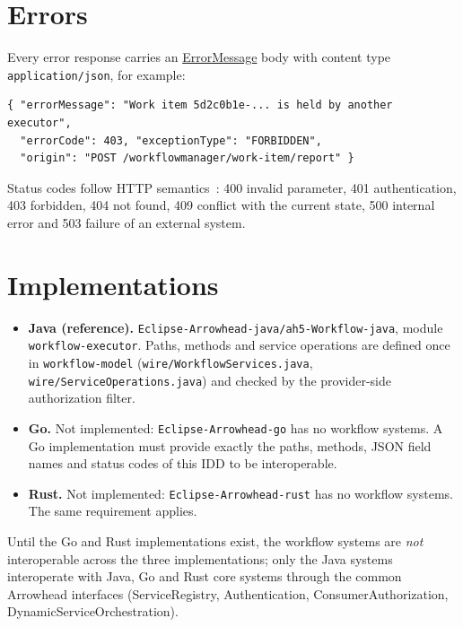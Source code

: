 \documentclass[a4paper]{arrowhead}
\newcommand{\mref}[1]{{\textcolor{ArrowheadPurple}{\hyperref[sec:model:#1]{#1}}}}
\begin{document}
\section{Errors}
\label{sec:errors}
Every error response carries an \mref{ErrorMessage} body with content type \texttt{application/\allowbreak{}json}, for example:
\begin{lstlisting}
{ "errorMessage": "Work item 5d2c0b1e-... is held by another executor",
  "errorCode": 403, "exceptionType": "FORBIDDEN",
  "origin": "POST /workflowmanager/work-item/report" }
\end{lstlisting}
Status codes follow HTTP semantics~\cite{rfc9110}: 400 invalid parameter, 401 authentication, 403 forbidden, 404 not
found, 409 conflict with the current state, 500 internal error and 503 failure of an external system.


\section{Implementations}
\label{sec:implementations}
\begin{itemize}
\item \textbf{Java (reference).} \texttt{Eclipse-\allowbreak{}Arrowhead-\allowbreak{}java/\allowbreak{}ah5-\allowbreak{}Workflow-\allowbreak{}java}, module \texttt{workflow-\allowbreak{}executor}. Paths, methods and service
operations are defined once in \texttt{workflow-\allowbreak{}model} (\texttt{wire/\allowbreak{}Workflow\allowbreak{}Services.\allowbreak{}java}, \texttt{wire/\allowbreak{}Service\allowbreak{}Operations.\allowbreak{}java}) and checked by the provider-side authorization filter.
\item \textbf{Go.} Not implemented: \texttt{Eclipse-\allowbreak{}Arrowhead-\allowbreak{}go} has no workflow systems. A Go implementation must
provide exactly the paths, methods, JSON field names and status codes of this IDD to be interoperable.
\item \textbf{Rust.} Not implemented: \texttt{Eclipse-\allowbreak{}Arrowhead-\allowbreak{}rust} has no workflow systems. The same requirement applies.
\end{itemize}
Until the Go and Rust implementations exist, the workflow systems are \emph{not} interoperable across the three
implementations; only the Java systems interoperate with Java, Go and Rust core systems through the common Arrowhead
interfaces (ServiceRegistry, Authentication, ConsumerAuthorization, DynamicServiceOrchestration).


\newpage


\end{document}
